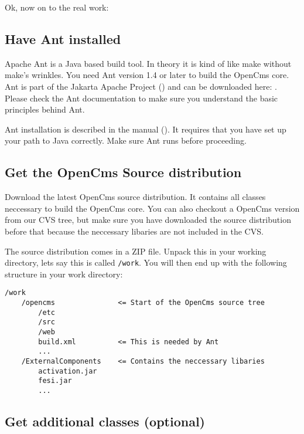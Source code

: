 Ok, now on to the real work:

\subsection{Have Ant installed}

Apache Ant is a Java based build tool. In theory it is kind of like make
without make's wrinkles. You need Ant version 1.4 or later to build the 
OpenCms core. Ant is part of the Jakarta Apache Project 
() and can be downloaded
here: . 
Please check the Ant documentation to make sure you understand the basic 
principles behind Ant. 

Ant installation is described in the manual
(). 
It requires that you have set up your path to Java correctly. Make sure 
Ant runs before proceeding.

\subsection{Get the OpenCms Source distribution}

Download the latest OpenCms source distribution. It contains all classes 
neccessary to build the OpenCms core. You can also checkout a OpenCms version
from our CVS tree, but make sure you have downloaded the source distribution 
before that because the neccessary libaries are not included in the CVS. 

The source distribution comes in a ZIP file. Unpack this in your working 
directory, lets say this is called \texttt{/work}. You will then end up with the 
following structure in your work directory:

\begin{verbatim}
/work
    /opencms               <= Start of the OpenCms source tree
        /etc
        /src
        /web
        build.xml          <= This is needed by Ant 
        ...  
    /ExternalComponents    <= Contains the neccessary libaries
        activation.jar
        fesi.jar
        ...
\end{verbatim}


\subsection{Get additional classes (optional)}

